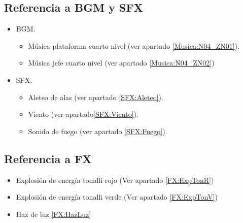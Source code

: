         \subsection{Referencia a BGM y SFX}
                \begin{itemize}
                        \item BGM.
                \begin{itemize}
                        \item Música plataforma cuarto nivel (ver apartado \ref{Musica:N04_ZN01}).
				\item Música jefe cuarto nivel (ver apartado \ref{Musica:N04_ZN02})
                \end{itemize}
				\item SFX.
                \begin{itemize}
                        \item Aleteo de alas (ver apartado \ref{SFX:Aleteo}).
                        \item Viento (ver apartado\ref{SFX:Viento}).
                        \item Sonido de fuego (ver apartado \ref{SFX:Fuego}).			
                \end{itemize}
                \end{itemize}

        \subsection{Referencia a FX}
\begin{itemize}    
	\item Explosión de energía tonalli rojo (Ver apartado \ref{FX:ExpTonR})
	\item Explosión de energía tonalli verde (Ver apartado \ref{FX:ExpTonV})
    \item Haz de luz \ref{FX:HazLuz}
    
\end{itemize}